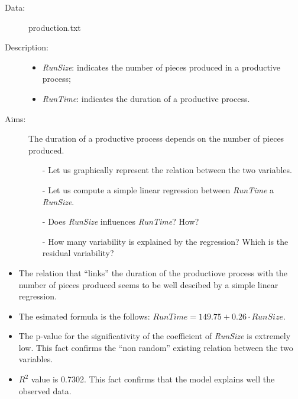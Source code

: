 \begin{frame}
  \begin{description}
    \item[Data: ]production.txt \\ 
    \item[Description: ]
      \begin{footnotesize}
        \begin{itemize}
          \item \textit{RunSize}: indicates the number of pieces produced in a productive process;
          \item \textit{RunTime}: indicates the duration of a productive process.
        \end{itemize}
      \end{footnotesize}
    \item[Aims: ]
      \begin{footnotesize}
        The duration of a productive process depends on the number of pieces produced.
        \begin{itemize}
          \item[-] Let us graphically represent the relation between the two variables.
          \item[-] Let us compute a simple linear regression between \textit{RunTime} a \textit{RunSize}.
          \item[-] Does \textit{RunSize} influences \textit{RunTime}? How?
          \item[-] How many variability is explained by the regression? Which is the residual variability? 
        \end{itemize}
      \end{footnotesize}
  \end{description}
\end{frame}

\begin{frame}
    \begin{itemize}
      \item The relation that ``links'' the duration of the productiove process with the number of pieces produced seems to be well descibed by a simple linear regression.
      \item The esimated formula is the follows:  $ RunTime = 149.75 + 0.26 \cdot RunSize $.
      \item The p-value for the significativity of the coefficient of \textit{RunSize} is extremely low. This fact confirms the ``non random'' existing relation between the two variables.
      \item $ R^2 $ value is 0.7302. This fact confirms that the model explains well the observed data.
    \end{itemize}
\end{frame}


